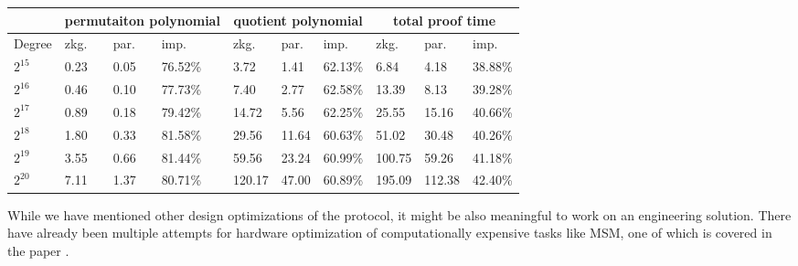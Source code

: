 \begin{table}[H]
\scriptsize
\begin{tabular}{|l|lll|lll|lll|}
\hline
 &
  \multicolumn{3}{c|}{permutaiton polynomial} &
  \multicolumn{3}{c|}{quotient polynomial} &
  \multicolumn{3}{c|}{total proof time} \\ \hline
Degree &
  \multicolumn{1}{l|}{zkg.} &
  \multicolumn{1}{l|}{par.} &
  imp. &
  \multicolumn{1}{l|}{zkg.} &
  \multicolumn{1}{l|}{par.} &
  imp. &
  \multicolumn{1}{l|}{zkg.} &
  \multicolumn{1}{l|}{par.} &
  imp. \\ \hline
$2^{15}$ &
  \multicolumn{1}{l|}{0.23} &
  \multicolumn{1}{l|}{0.05} &
  76.52\% &
  \multicolumn{1}{l|}{3.72} &
  \multicolumn{1}{l|}{1.41} &
  62.13\% &
  \multicolumn{1}{l|}{6.84} &
  \multicolumn{1}{l|}{4.18} &
  38.88\% \\ \hline
$2^{16}$ &
  \multicolumn{1}{l|}{0.46} &
  \multicolumn{1}{l|}{0.10} &
  77.73\% &
  \multicolumn{1}{l|}{7.40} &
  \multicolumn{1}{l|}{2.77} &
  62.58\% &
  \multicolumn{1}{l|}{13.39} &
  \multicolumn{1}{l|}{8.13} &
  39.28\% \\ \hline
$2^{17}$ &
  \multicolumn{1}{l|}{0.89} &
  \multicolumn{1}{l|}{0.18} &
  79.42\% &
  \multicolumn{1}{l|}{14.72} &
  \multicolumn{1}{l|}{5.56} &
  62.25\% &
  \multicolumn{1}{l|}{25.55} &
  \multicolumn{1}{l|}{15.16} &
  40.66\% \\ \hline
$2^{18}$ &
  \multicolumn{1}{l|}{1.80} &
  \multicolumn{1}{l|}{0.33} &
  81.58\% &
  \multicolumn{1}{l|}{29.56} &
  \multicolumn{1}{l|}{11.64} &
  60.63\% &
  \multicolumn{1}{l|}{51.02} &
  \multicolumn{1}{l|}{30.48} &
  40.26\% \\ \hline
$2^{19}$ &
  \multicolumn{1}{l|}{3.55} &
  \multicolumn{1}{l|}{0.66} &
  81.44\% &
  \multicolumn{1}{l|}{59.56} &
  \multicolumn{1}{l|}{23.24} &
  60.99\% &
  \multicolumn{1}{l|}{100.75} &
  \multicolumn{1}{l|}{59.26} &
  41.18\% \\ \hline
$2^{20}$ &
  \multicolumn{1}{l|}{7.11} &
  \multicolumn{1}{l|}{1.37} &
  80.71\% &
  \multicolumn{1}{l|}{120.17} &
  \multicolumn{1}{l|}{47.00} &
  60.89\% &
  \multicolumn{1}{l|}{195.09} &
  \multicolumn{1}{l|}{112.38} &
  42.40\% \\ \hline
\end{tabular}
\end{table}

While we have mentioned other design optimizations of the protocol, it might be also meaningful to work on an engineering solution. There have already been multiple attempts for hardware optimization of computationally expensive tasks like MSM, one of which is covered in the paper \cite{pipeMSM}.


